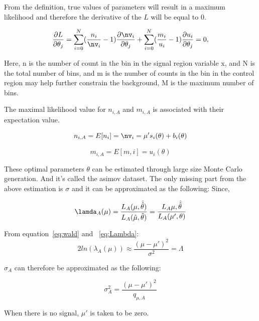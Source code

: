 From the definition, true values of parameters will result in a maximum likelihood and therefore the derivative of the ${L}$ will be equal to 0. 

\begin{equation}
\frac{\partial{L}}{\partial{\theta_{j}}} = \sum_{i=0}^{N}(\frac{n_{i}}{\nv_{i}}-1) \frac{\partial{\nv_{i}}}{\partial{\theta_{j}}}+ \sum_{i=0}^{N}(\frac{m_{i}}{u_{i}}-1) \frac{\partial{u_{i}}}{\partial{\theta_{j}}} =  0 , 
\end{equation}

Here, n is the number of count in the bin in the signal region variable x, and N is the total number of bins, and m is the number of counts in the bin in the control region may help further constrain the background, M is the maximum number of bins. 

The maximal likelihood value for $n_{i,A}$ and $m_{i,A}$ is associated with their expectation value. 

\begin{equation}
 n_{i,A} = E[n_{i}] = \nv_{i} = \mu's_{i}(\theta) + b_{i}(\theta)
\end{equation}

\begin{equation}
m_{i,A} = E[m,i] = u_{i}(\theta)
\end{equation}


These optimal parameters $\theta$ can be estimated through large size Monte Carlo generation. And it's called the asimov dataset.
The only missing part from the above estimation is $\sigma$ and it can be approximated as the following: 
Since, 

\begin{equation}
    \lamda_{A}(\mu) = \frac{L_{A}(\mu, \hat{\hat{\theta}})}{L_{A}(\hat{\mu}, \hat{\theta})}
= \frac{L_{A}{\mu, \hat{\hat{\theta}}}}{L_{A}(\mu', \theta)}
\end{equation}


From equation~\ref{eq:wald} and ~\ref{eq:Lambda}:
\begin{equation}
2ln(\lambda_{A}(\mu)) \approx \frac{(\mu-\mu')^{2}}{\sigma^{2}}=\Lambda
\end{equation}

$\sigma_{A}$ can therefore be approximated as the following:

\begin{equation}
    \sigma_{A}^{2} = \frac{(\mu-\mu')^{2}}{q_{\mu,A}}
\end{equation}

When there is no signal, $\mu'$ is taken to be zero. 


